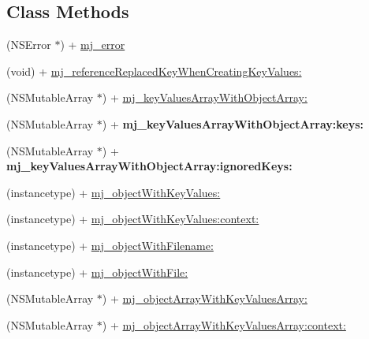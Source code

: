 \subsection*{Class Methods}
\begin{DoxyCompactItemize}
\item 
(N\+S\+Error $\ast$) + \mbox{\hyperlink{category_n_s_object_07_m_j_key_value_08_ab6e5a0c2a22f66eda49c4d13327f7607}{mj\+\_\+error}}
\item 
(void) + \mbox{\hyperlink{category_n_s_object_07_m_j_key_value_08_a5ef85ce0a227c02af06d33051a0d77cb}{mj\+\_\+reference\+Replaced\+Key\+When\+Creating\+Key\+Values\+:}}
\item 
(N\+S\+Mutable\+Array $\ast$) + \mbox{\hyperlink{category_n_s_object_07_m_j_key_value_08_ab839459f5ea5711e5c030130431db942}{mj\+\_\+key\+Values\+Array\+With\+Object\+Array\+:}}
\item 
\mbox{\label{category_n_s_object_07_m_j_key_value_08_af594c7b37a1b2c8eb47842f09e61f449}} 
(N\+S\+Mutable\+Array $\ast$) + {\bfseries mj\+\_\+key\+Values\+Array\+With\+Object\+Array\+:keys\+:}
\item 
\mbox{\label{category_n_s_object_07_m_j_key_value_08_a0dfaed3d6d91f165b666058e551dcff6}} 
(N\+S\+Mutable\+Array $\ast$) + {\bfseries mj\+\_\+key\+Values\+Array\+With\+Object\+Array\+:ignored\+Keys\+:}
\item 
(instancetype) + \mbox{\hyperlink{category_n_s_object_07_m_j_key_value_08_a8620ab8d9fd3e832d4f8de504f49724d}{mj\+\_\+object\+With\+Key\+Values\+:}}
\item 
(instancetype) + \mbox{\hyperlink{category_n_s_object_07_m_j_key_value_08_aac86cc29566e0ff89cadb66d79a61db8}{mj\+\_\+object\+With\+Key\+Values\+:context\+:}}
\item 
(instancetype) + \mbox{\hyperlink{category_n_s_object_07_m_j_key_value_08_a44d9d52cc68ef8c354e28ddc5973aecb}{mj\+\_\+object\+With\+Filename\+:}}
\item 
(instancetype) + \mbox{\hyperlink{category_n_s_object_07_m_j_key_value_08_a98ff8a880e1de766fe702c800c1ec70d}{mj\+\_\+object\+With\+File\+:}}
\item 
(N\+S\+Mutable\+Array $\ast$) + \mbox{\hyperlink{category_n_s_object_07_m_j_key_value_08_a4bbc4da54fe5f2fddc993aad366ff617}{mj\+\_\+object\+Array\+With\+Key\+Values\+Array\+:}}
\item 
(N\+S\+Mutable\+Array $\ast$) + \mbox{\hyperlink{category_n_s_object_07_m_j_key_value_08_a38ad57bdfe18e6432c8dc94569c3be7d}{mj\+\_\+object\+Array\+With\+Key\+Values\+Array\+:context\+:}}

\end{DoxyCompactItemize}
